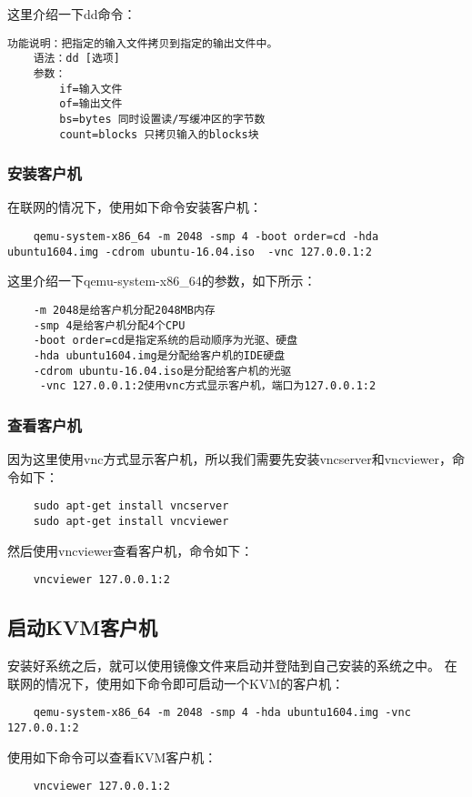 \documentclass[a4paper,left=2.5cm,right=2.5cm,11pt]{article}
\begin{document}
	这里介绍一下dd命令：
	\begin{lstlisting}[numberstyle = \color{white}]
	功能说明：把指定的输入文件拷贝到指定的输出文件中。
	语法：dd [选项]
	参数：
		if=输入文件
		of=输出文件
		bs=bytes 同时设置读/写缓冲区的字节数
		count=blocks 只拷贝输入的blocks块
	\end{lstlisting}

\subsubsection{安装客户机}
	在联网的情况下，使用如下命令安装客户机：
	\begin{lstlisting}
	qemu-system-x86_64 -m 2048 -smp 4 -boot order=cd -hda ubuntu1604.img -cdrom ubuntu-16.04.iso  -vnc 127.0.0.1:2
	\end{lstlisting}

	这里介绍一下qemu-system-x86\_64的参数，如下所示：
	\begin{lstlisting}
	-m 2048是给客户机分配2048MB内存
	-smp 4是给客户机分配4个CPU
	-boot order=cd是指定系统的启动顺序为光驱、硬盘
	-hda ubuntu1604.img是分配给客户机的IDE硬盘
	-cdrom ubuntu-16.04.iso是分配给客户机的光驱
	 -vnc 127.0.0.1:2使用vnc方式显示客户机，端口为127.0.0.1:2
	\end{lstlisting}

\subsubsection{查看客户机}
	因为这里使用vnc方式显示客户机，所以我们需要先安装vncserver和vncviewer，命令如下：
	\begin{lstlisting}
	sudo apt-get install vncserver
	sudo apt-get install vncviewer
	\end{lstlisting}

	然后使用vncviewer查看客户机，命令如下：
	\begin{lstlisting}
	vncviewer 127.0.0.1:2
	\end{lstlisting}

\subsection{启动KVM客户机}
	安装好系统之后，就可以使用镜像文件来启动并登陆到自己安装的系统之中。
	在联网的情况下，使用如下命令即可启动一个KVM的客户机：
	\begin{lstlisting}
	qemu-system-x86_64 -m 2048 -smp 4 -hda ubuntu1604.img -vnc 127.0.0.1:2
	\end{lstlisting}

	使用如下命令可以查看KVM客户机：
	\begin{lstlisting}
	vncviewer 127.0.0.1:2
	\end{lstlisting}
\end{document}
